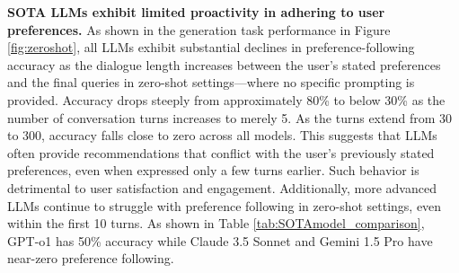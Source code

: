 \textbf{SOTA LLMs exhibit limited proactivity in adhering to user preferences.} As shown in the generation task performance in Figure \ref{fig:zeroshot}, all LLMs exhibit substantial declines in preference-following accuracy as the dialogue length increases between the user’s stated preferences and the final queries in zero-shot settings—where no specific prompting is provided. Accuracy drops steeply from approximately 80\% to below 30\% as the number of conversation turns increases to merely 5. As the turns extend from 30 to 300, accuracy falls close to zero across all models. This suggests that LLMs often provide recommendations that conflict with the user’s previously stated preferences, even when expressed only a few turns earlier. Such behavior is detrimental to user satisfaction and engagement. Additionally, more advanced LLMs continue to struggle with preference following in zero-shot settings, even within the first 10 turns. As shown in Table \ref{tab:SOTAmodel_comparison}, GPT-o1 has 50\% accuracy while Claude 3.5 Sonnet and Gemini 1.5 Pro have near-zero preference following.
\begin{table}[h]
    \centering

\caption{Results of preference-following accuracy across SOTA LLMs evaluated using two context lengths between the user's preference and query. We show results for two methods: Zero-shot and Reminder (best prompting method), on the generation task for the \textit{travel restaurant} topic.}
    
    \label{tab:SOTAmodel_comparison}

\end{table}



